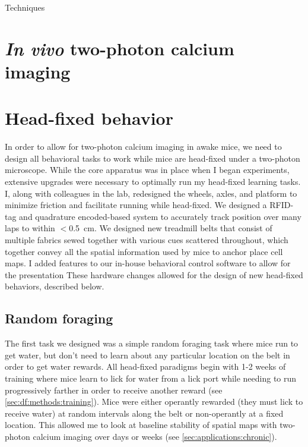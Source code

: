 Techniques

\section{\emph{In vivo} two-photon calcium imaging}

\section{Head-fixed behavior}\label{sec:intro:techniques:behavior}
In order to allow for two-photon calcium imaging in awake mice, we need to design all behavioral tasks to work while mice are head-fixed under a two-photon microscope.
While the core apparatus was in place when I began experiments, extensive upgrades were necessary to optimally run my head-fixed learning tasks.
I, along with colleagues in the lab, redesigned the wheels, axles, and platform to minimize friction and facilitate running while head-fixed.
We designed a RFID-tag and quadrature encoded-based system to accurately track position over many laps to within $<$0.5~cm.
We designed new treadmill belts that consist of multiple fabrics sewed together with various cues scattered throughout, which together convey all the spatial information used by mice to anchor place cell maps.
I added features to our in-house behavioral control software to allow for the presentation
These hardware changes allowed for the design of new head-fixed behaviors, described below.

\subsection{Random foraging}
The first task we designed was a simple random foraging task where mice run to get water, but don't need to learn about any particular location on the belt in order to get water rewards.
All head-fixed paradigms begin with 1-2 weeks of training where mice learn to lick for water from a lick port while needing to run progressively farther in order to receive another reward (see \autoref{sec:df:methods:training}).
Mice were either operantly rewarded (they must lick to receive water) at random intervals along the belt or non-operantly at a fixed location.
This allowed me to look at baseline stability of spatial maps with two-photon calcium imaging over days or weeks (see \autoref{sec:applications:chronic}).

